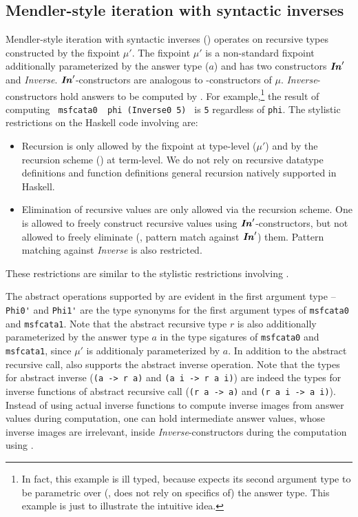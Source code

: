 \begin{figure}

\vspace*{-3ex}
\end{figure}


\subsection{Mendler-style iteration with syntactic inverses}
Mendler-style iteration with syntactic inverses (\msfit{}) operates on
recursive types constructed by the fixpoint $\mu'$. The fixpoint $\mu'$
is a non-standard fixpoint additionally parameterized by the answer type ($a$)
and has two constructors $\textbf{\textit{In}}_{}'$ and \textit{Inverse}. $\textbf{\textit{In}}_{}'$-constructors
are analogous to \In{}-constructors of $\mu$. \textit{Inverse}-constructors
hold answers to be computed by \msfit{}. For example,\footnote{
	In fact, this example is ill typed, because \msfit{} expects
	its second argument type to be parametric over
	(\ie, does not rely on specifics of) the answer type.
	This example is just to illustrate the intuitive idea.}
the result of computing \lstinline{ msfcata0  phi (Inverse0 5) }
is \lstinline{5} regardless of \lstinline{phi}.
The stylistic restrictions on the Haskell code involving \msfit{} are:
\begin{itemize}
\item Recursion is only allowed by the fixpoint at type-level ($\mu'$)
	and by the recursion scheme (\msfit{}) at term-level.
We do not rely on recursive datatype definitions and function definitions
general recursion
natively supported in Haskell.
\item Elimination of recursive values are only allowed via the recursion scheme.
One is allowed to freely construct recursive values using $\textbf{\textit{In}}_{}'$-constructors,
but not allowed to freely eliminate (\ie, pattern match against $\textbf{\textit{In}}_{}'$) them.
Pattern matching against \textit{Inverse} is also restricted.
\end{itemize}
These restrictions are similar to the stylistic restrictions involving \MIt{}.

The abstract operations supported by \msfit{} are evident
in the first argument type -- \lstinline{Phi0'} and \lstinline{Phi1'}
are the type synonyms for the first argument types of \lstinline{msfcata0}
and \lstinline{msfcata1}. Note that the abstract recursive type $r$ is also
additionally parameterized by the answer type $a$ in the type sigatures
of \lstinline{msfcata0} and \lstinline{msfcata1}, since $\mu'$ is additionaly
parameterized by $a$. In addition to the abstract recursive call, \msfit{}
also supports the abstract inverse operation. Note that the types for
abstract inverse (\lstinline{(a -> r a)} and \lstinline{(a i -> r a i)})
are indeed the types for inverse functions of abstract recursive call
(\lstinline{(r a -> a)} and \lstinline{(r a i -> a i)}). Instead of using
actual inverse functions to compute inverse images from answer values
during computation, one can hold intermediate answer values, whose inverse
images are irrelevant, inside \textit{Inverse}-constructors during
the computation using \msfit{}.

